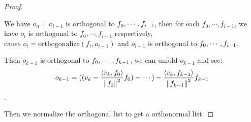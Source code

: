 \documentclass[../main.tex]{subfiles}
\begin{document}
\begin{proof}
\begin{itemize}
          We have $o_n = o_{i - 1}$ is orthogonal to $f_0 , \cdots , f_{i - 1}$, then for each $f_0, \cdots, f_{i - 1}$,
          we have $o_i$ is orthogonal to $f_0, \cdots, f_{i - 1}$ respectively, \\
          cause $o_i = \mathrm{orthogonalize}(f_i, o_{i - 1})$ and $o_{i - 1}$ is
          orthogonal to $f_0 , \cdots , f_{i - 1}$.
  \end{itemize}

  Then $o_{k - 1}$ is orthogonal to $f_0 , \cdots , f_{k - 1}$, we can unfold $o_{k - 1}$
  and see:
  \[
  o_{k - 1} = ((v_k - \frac{\langle v_k , f_0\rangle}{\left\Vert f_0 \right\Vert^2}f_0) - \cdots) - \frac{\langle v_k , f_{k - 1}\rangle}{\left\Vert f_{k - 1} \right\Vert^2}f_{k - 1}
  \].

  Then we normalize the orthogonal list to get a orthonormal list.
\end{proof}
\end{document}
